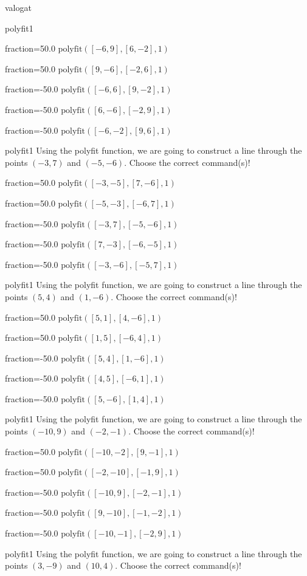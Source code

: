\documentclass[12pt]{article}
\begin{document}
\begin{quiz}{valogat}
\begin{multi}[multiple]{polyfit1}
\item[fraction=50.0] $\mathrm{polyfit}([-6,9], [6,-2], 1)$
\item[fraction=50.0] $\mathrm{polyfit}([9,-6], [-2,6], 1)$
\item[fraction=-50.0]  $\mathrm{polyfit}([-6,6], [9,-2], 1)$
\item[fraction=-50.0]  $\mathrm{polyfit}([6,-6], [-2,9], 1)$
\item[fraction=-50.0]  $\mathrm{polyfit}([-6,-2], [9,6], 1)$
\end{multi}
\begin{multi}[multiple]{polyfit1}
Using the polyfit function, we are going to construct a line through the points $\left(-3,7\right)$ and $\left(-5,-6\right)$.
Choose the correct command(s)!

\item[fraction=50.0] $\mathrm{polyfit}([-3,-5], [7,-6], 1)$
\item[fraction=50.0] $\mathrm{polyfit}([-5,-3], [-6,7], 1)$
\item[fraction=-50.0]  $\mathrm{polyfit}([-3,7], [-5,-6], 1)$
\item[fraction=-50.0]  $\mathrm{polyfit}([7,-3], [-6,-5], 1)$
\item[fraction=-50.0]  $\mathrm{polyfit}([-3,-6], [-5,7], 1)$
\end{multi}
\begin{multi}[multiple]{polyfit1}
Using the polyfit function, we are going to construct a line through the points $\left(5,4\right)$ and $\left(1,-6\right)$.
Choose the correct command(s)!

\item[fraction=50.0] $\mathrm{polyfit}([5,1], [4,-6], 1)$
\item[fraction=50.0] $\mathrm{polyfit}([1,5], [-6,4], 1)$
\item[fraction=-50.0]  $\mathrm{polyfit}([5,4], [1,-6], 1)$
\item[fraction=-50.0]  $\mathrm{polyfit}([4,5], [-6,1], 1)$
\item[fraction=-50.0]  $\mathrm{polyfit}([5,-6], [1,4], 1)$
\end{multi}
\begin{multi}[multiple]{polyfit1}
Using the polyfit function, we are going to construct a line through the points $\left(-10,9\right)$ and $\left(-2,-1\right)$.
Choose the correct command(s)!

\item[fraction=50.0] $\mathrm{polyfit}([-10,-2], [9,-1], 1)$
\item[fraction=50.0] $\mathrm{polyfit}([-2,-10], [-1,9], 1)$
\item[fraction=-50.0]  $\mathrm{polyfit}([-10,9], [-2,-1], 1)$
\item[fraction=-50.0]  $\mathrm{polyfit}([9,-10], [-1,-2], 1)$
\item[fraction=-50.0]  $\mathrm{polyfit}([-10,-1], [-2,9], 1)$
\end{multi}
\begin{multi}[multiple]{polyfit1}
Using the polyfit function, we are going to construct a line through the points $\left(3,-9\right)$ and $\left(10,4\right)$.
Choose the correct command(s)!


\end{multi}
\end{quiz}
\end{document}
